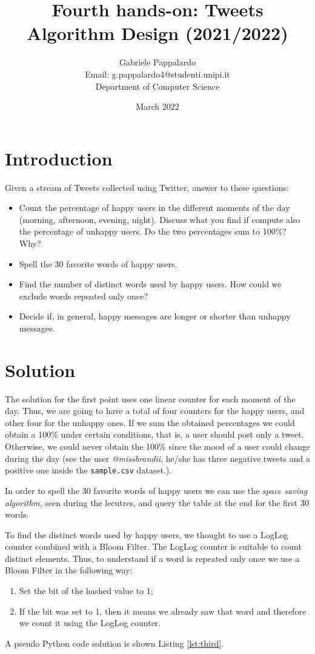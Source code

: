 \documentclass{article}
\title{Fourth hands-on: Tweets \\[1ex] \large Algorithm Design (2021/2022)}
\author{Gabriele Pappalardo\\Email: g.pappalardo4@studenti.unipi.it\\Department of Computer Science}
\date{March 2022}
\begin{document}
\maketitle

\section{Introduction}

Given a stream of Tweets collected using Twitter, answer to these questions:
\begin{itemize}
    \item Count the percentage of happy users in the different moments of the day (morning, afternoon, evening, night). Discuss what you find if compute also the percentage of unhappy users. Do the two percentages sum to 100\%? Why?
    
    \item Spell the 30 favorite words of happy users.
    
    \item Find the number of distinct words used by happy users. How could we exclude words repeated only once?

    \item Decide if, in general, happy messages are longer or shorter than unhappy messages.    
\end{itemize}

\section{Solution}

The solution for the first point uses one linear counter for each moment of the day. Thus, we are going to have a total of four counters for the happy users, and other four for the unhappy ones. If we sum the obtained percentages we could obtain
a 100\% under certain conditions, that is, a user should post only a tweet. Otherwise, we could never obtain the 100\% since the mood
of a user could change during the day (see the user \textit{@missbrandii}, he/she has three negative tweets and a positive one inside the \verb+sample.csv+ dataset.). \newline

\noindent In order to spell the 30 favorite words of happy users we can use the \textit{space saving algorithm}, seen during the lecutres, and query the table at the
end for the first 30 words. \newline

\noindent To find the distinct words used by happy users, we thought to use a LogLog counter combined with a Bloom Filter.
The LogLog counter is suitable to count distinct elements. Thus, to understand if a word is repeated only once we use a Bloom Filter in the following way:
\begin{enumerate}
\item Set the bit of the hashed value to 1;
\item If the bit was set to 1, then it means we already saw that word and therefore we count it using the LogLog counter.
\end{enumerate}
A pseudo Python code solution is shown Listing \ref{lst:third}.
\end{document}
